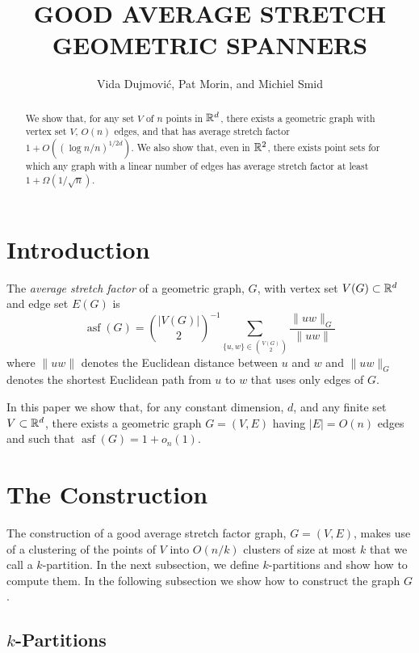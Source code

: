 \documentclass{patmorin}
\title{\MakeUppercase{Good Average Stretch Geometric Spanners}}
\author{Vida Dujmovi\'c, Pat Morin, and Michiel Smid}
\DeclareMathOperator{\asf}{asf}
\begin{document}
\begin{titlepage}
\maketitle
{}

\begin{abstract}
  We show that, for any set $V$ of $n$ points in $\mathbb{R}^d$, there exists
  a geometric graph with vertex set $V$, $O(n)$ edges, and that has
  average stretch factor $1+ O((\log n/n)^{1/2d})$.
  We also show that, even in $\mathbb{R}^2$, there exists point sets for which
  any graph with a linear number of edges has average stretch factor
  at least $1+\Omega(1/\sqrt{n})$.
\end{abstract}

\end{titlepage}

\section{Introduction}

The \emph{average stretch factor} of a geometric graph, $G$, with vertex
set $V(G)\subset \mathbb{R}^d$ and edge set $E(G)$ is
\[
    \asf(G) = \binom{|V(G)|}{2}^{-1}\sum_{\{u,w\}\in\binom{V(G)}{2}}\frac{\|uw\|_G}{\|uw\|}
\]
where $\|uw\|$ denotes the Euclidean distance between $u$ and $w$
and $\|uw\|_G$ denotes the shortest Euclidean path from $u$ to $w$
that uses only edges of $G$.

In this paper we show that, for any constant dimension, $d$, and any
finite set $V\subset \mathbb{R}^d$, there exists a geometric graph $G=(V,E)$
having $|E|=O(n)$ edges and such that $\asf(G)=1+o_n(1)$.

\section{The Construction}

The construction of a good average stretch factor graph, $G=(V,E)$,
makes use of a clustering of the points of $V$ into $O(n/k)$ clusters of
size at most $k$ that we call a $k$-partition.  In the next subsection,
we define $k$-partitions and show how to compute them.  In the following
subsection we show how to construct the graph $G$.

\subsection{$k$-Partitions}
\end{document}
